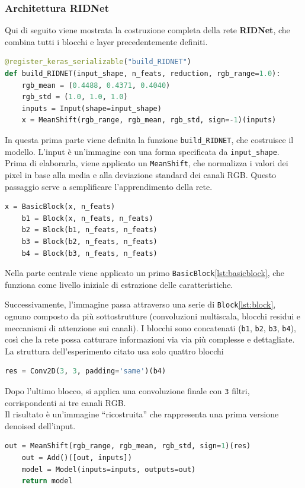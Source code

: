 \documentclass[12pt,a4paper,openright,twoside]{book}
\begin{document}
\subsubsection*{Architettura RIDNet}
Qui di seguito viene mostrata la costruzione completa della rete \textbf{RIDNet}, che combina tutti i blocchi e layer precedentemente definiti.
\begin{lstlisting}[language=Python, caption={Costruzione dell'architettura completa RIDNet}, label={lst:build_ridnet}]
@register_keras_serializable("build_RIDNET")
def build_RIDNET(input_shape, n_feats, reduction, rgb_range=1.0):
    rgb_mean = (0.4488, 0.4371, 0.4040)
    rgb_std = (1.0, 1.0, 1.0)
    inputs = Input(shape=input_shape)
    x = MeanShift(rgb_range, rgb_mean, rgb_std, sign=-1)(inputs)
\end{lstlisting}

In questa prima parte viene definita la funzione \texttt{build\_RIDNET}, che costruisce il modello.
L'input è un'immagine con una forma specificata da \texttt{input\_shape}. Prima di elaborarla, viene applicato un \texttt{MeanShift}, che normalizza i valori dei pixel in base alla media e alla deviazione standard dei canali RGB.
Questo passaggio serve a semplificare l'apprendimento della rete.

\begin{lstlisting}[language=Python, caption={Corpo della ridnet}, label={lst:ridnet_block}]
    x = BasicBlock(x, n_feats)
    b1 = Block(x, n_feats, n_feats)
    b2 = Block(b1, n_feats, n_feats)
    b3 = Block(b2, n_feats, n_feats)
    b4 = Block(b3, n_feats, n_feats)
\end{lstlisting}
Nella parte centrale viene applicato un primo \texttt{BasicBlock}\ref{lst:basicblock}, che funziona come livello iniziale di estrazione delle caratteristiche.

Successivamente, l'immagine passa attraverso una serie di \texttt{Block}\ref{lst:block}, ognuno composto da più sottostrutture (convoluzioni multiscala, blocchi residui e meccanismi di attenzione sui canali). I blocchi sono concatenati (\texttt{b1}, \texttt{b2}, \texttt{b3}, \texttt{b4}), così che la rete possa catturare informazioni via via più complesse e dettagliate.
La struttura dell'esperimento citato \parencite{9010324} usa solo quattro blocchi

\begin{lstlisting}[language=Python, caption={Ultimo blocco della rete}, label={lst:last_ridnet}]
    res = Conv2D(3, 3, padding='same')(b4)
\end{lstlisting}
Dopo l'ultimo blocco, si applica una convoluzione finale con \texttt{3} filtri, corrispondenti ai tre canali RGB.\\
Il risultato è un'immagine “ricostruita” che rappresenta una prima versione denoised dell'input.
\begin{lstlisting}[language=Python, caption={Pezzo finale della rete}, label={lst:}]
    out = MeanShift(rgb_range, rgb_mean, rgb_std, sign=1)(res)
    out = Add()([out, inputs])
    model = Model(inputs=inputs, outputs=out)
    return model
\end{lstlisting}
\end{document}
